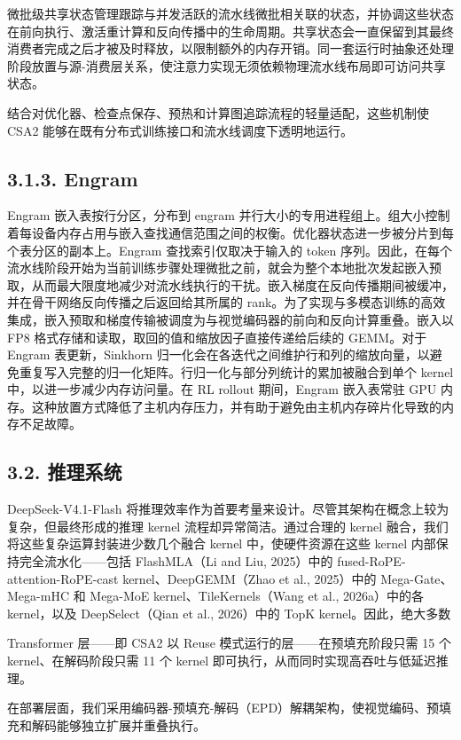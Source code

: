微批级共享状态管理跟踪与并发活跃的流水线微批相关联的状态，并协调这些状态在前向执行、激活重计算和反向传播中的生命周期。共享状态会一直保留到其最终消费者完成之后才被及时释放，以限制额外的内存开销。同一套运行时抽象还处理阶段放置与源-消费层关系，使注意力实现无须依赖物理流水线布局即可访问共享状态。

结合对优化器、检查点保存、预热和计算图追踪流程的轻量适配，这些机制使 CSA2 能够在既有分布式训练接口和流水线调度下透明地运行。

\subsection{3.1.3. Engram}\label{engram-1}

Engram 嵌入表按行分区，分布到 engram 并行大小的专用进程组上。组大小控制着每设备内存占用与嵌入查找通信范围之间的权衡。优化器状态进一步被分片到每个表分区的副本上。Engram 查找索引仅取决于输入的 token 序列。因此，在每个流水线阶段开始为当前训练步骤处理微批之前，就会为整个本地批次发起嵌入预取，从而最大限度地减少对流水线执行的干扰。嵌入梯度在反向传播期间被缓冲，并在骨干网络反向传播之后返回给其所属的 rank。为了实现与多模态训练的高效集成，嵌入预取和梯度传输被调度为与视觉编码器的前向和反向计算重叠。嵌入以 FP8 格式存储和读取，取回的值和缩放因子直接传递给后续的 GEMM。对于 Engram 表更新，Sinkhorn 归一化会在各迭代之间维护行和列的缩放向量，以避免重复写入完整的归一化矩阵。行归一化与部分列统计的累加被融合到单个 kernel 中，以进一步减少内存访问量。在 RL rollout 期间，Engram 嵌入表常驻 GPU 内存。这种放置方式降低了主机内存压力，并有助于避免由主机内存碎片化导致的内存不足故障。

\subsection{3.2. 推理系统}\label{inference-system}

DeepSeek-V4.1-Flash 将推理效率作为首要考量来设计。尽管其架构在概念上较为复杂，但最终形成的推理 kernel 流程却异常简洁。通过合理的 kernel 融合，我们将这些复杂运算封装进少数几个融合 kernel 中，使硬件资源在这些 kernel 内部保持完全流水化——包括 FlashMLA（Li and Liu, 2025）中的 fused-RoPE-attention-RoPE-cast kernel、DeepGEMM（Zhao et al., 2025）中的 Mega-Gate、Mega-mHC 和 Mega-MoE kernel、TileKernels（Wang et al., 2026a）中的各 kernel，以及 DeepSelect（Qian et al., 2026）中的 TopK kernel。因此，绝大多数



Transformer 层——即 CSA2 以 Reuse 模式运行的层——在预填充阶段只需 15 个 kernel、在解码阶段只需 11 个 kernel 即可执行，从而同时实现高吞吐与低延迟推理。

在部署层面，我们采用编码器-预填充-解码（EPD）解耦架构，使视觉编码、预填充和解码能够独立扩展并重叠执行。